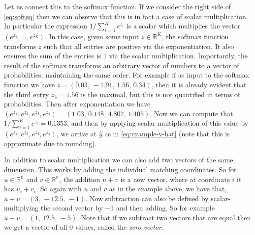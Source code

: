 Let us connect this to the softmax function. If we consider the right side of \eqref{eq:softeq} then we can observe that this is in fact a case of scalar multiplication. In particular the expression $1/\sum_{i=1}^K e^{z_i}$ is a scalar which multiplies the vector $(e^{z_1},\ldots,e^{z_K})$. In this case, given some input $z \in {\mathbb R}^K$, the softmax function transforms $z$ such that all entries are positive via the exponentiation. It also ensures the sum of the entries is $1$ via the scalar multiplication. Importantly, the result of the softmax transforms an arbitrary vector of numbers to a vector of probabilities, maintaining the same order. For example if as input to the softmax function we have $z = (0.03,\, -1.91, \, 1.56, \, 0.34)$, then it is already evident that the third entry $z_3 = 1.56$ is the maximal, but this is not quantified in terms of probabilities. Then after exponentiation we have $(e^{z_1}, e^{z_2}, e^{z_3}, e^{z_4}) = (1.03,\,0.148,\,4.807,\,1.405)$. Now we can compute that $1/\sum_{i=1}^K e^{z_i} = 0.1353$, and then by applying scalar multiplication of this value by $(e^{z_1}, e^{z_2}, e^{z_3}, e^{z_4})$, we arrive at $\hat{y}$ as in \eqref{eq:example-y-hat} (note that this is approximate due to rounding).

In addition to scalar multiplication we can also add two vectors of the same dimension. This works by adding the individual matching coordinates. So for $u \in {\mathbb R}^n$ and $v \in {\mathbb R}^n$, the addition $u+v$ is a new vector, where at coordinate $i$ it has $u_i + v_i$. So again with $u$ and $v$ as in the example above, we have that, $u+v = (3, \, -12.5, \, -1)$. Now subtraction can also be defined by scalar-multiplying the second vector by $-1$ and then adding. So for example $u-v = (1,\, 12.5,\, -5)$. Note that if we subtract two vectors that are equal then we get a vector of all $0$ values, called the {\em zero vector}.

